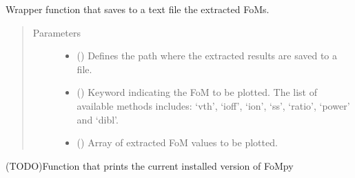 \documentclass[letterpaper,10pt,english,openany, oneside]{sphinxmanual}
\begin{document}
\begin{fulllineitems}
\label{\detokenize{index:fompy.wrappers.savetotxt}}
Wrapper function that saves to a text file the extracted FoMs.
\begin{quote}\begin{description}
\item[{Parameters}] \leavevmode\begin{itemize}
\item {} 
 () \textendash{} Defines the path where the extracted results are saved to a file.

\item {} 
 () \textendash{} Keyword indicating the FoM to be plotted. The list of available methods includes:
‘vth’, ‘ioff’, ‘ion’, ‘ss’, ‘ratio’, ‘power’ and ‘dibl’.

\item {} 
 () \textendash{} Array of extracted FoM values to be plotted.

\end{itemize}

\end{description}\end{quote}

\end{fulllineitems}


\begin{fulllineitems}
\label{\detokenize{index:fompy.wrappers.version}}
(TODO)Function that prints the current installed version of FoMpy

\end{fulllineitems}




\renewcommand{\indexname}{Index}
\printindex
\end{document}
